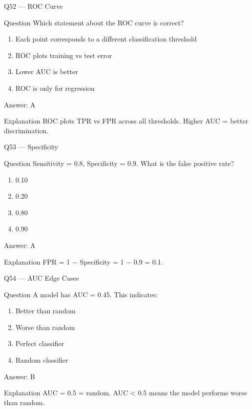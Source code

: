 \documentclass[aspectratio=169,8pt]{beamer}
\begin{document}
	\begin{frame}{Q52 --- ROC Curve}
		\begin{block}{Question}
			Which statement about the ROC curve is correct?
		\end{block}
		\begin{enumerate}
			\item Each point corresponds to a different classification threshold
			\item ROC plots training vs test error
			\item Lower AUC is better
			\item ROC is only for regression
		\end{enumerate}
		\begin{exampleblock}{Answer: A}\end{exampleblock}
		\begin{block}{Explanation}
			ROC plots TPR vs FPR across all thresholds. Higher AUC = better discrimination.
		\end{block}
	\end{frame}
	
	\begin{frame}{Q53 --- Specificity}
		\begin{block}{Question}
			Sensitivity = 0.8, Specificity = 0.9. What is the false positive rate?
		\end{block}
		\begin{enumerate}
			\item 0.10
			\item 0.20
			\item 0.80
			\item 0.90
		\end{enumerate}
		\begin{exampleblock}{Answer: A}\end{exampleblock}
		\begin{block}{Explanation}
			FPR = 1 $-$ Specificity = 1 $-$ 0.9 = 0.1.
		\end{block}
	\end{frame}
	
	\begin{frame}{Q54 --- AUC Edge Cases}
		\begin{block}{Question}
			A model has AUC = 0.45. This indicates:
		\end{block}
		\begin{enumerate}
			\item Better than random
			\item Worse than random
			\item Perfect classifier
			\item Random classifier
		\end{enumerate}
		\begin{exampleblock}{Answer: B}\end{exampleblock}
		\begin{block}{Explanation}
			AUC = 0.5 = random. AUC < 0.5 means the model performs worse than random.
		\end{block}
	\end{frame}
	
\end{document}
